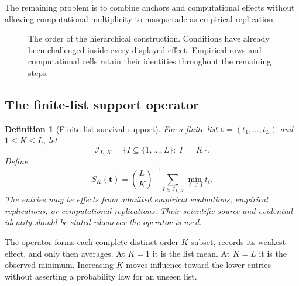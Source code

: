 \documentclass[11pt]{article}
\newtheorem{definition}{Definition}
\theoremstyle{remark}
\begin{document}
The remaining problem is to combine anchors and computational effects without
allowing computational multiplicity to masquerade as empirical replication.

\begin{figure}[htbp]
\centering
{}
\caption{The order of the hierarchical construction. Conditions have already
been challenged inside every displayed effect. Empirical rows and
computational cells retain their identities throughout the remaining steps.}
\label{fig:hierarchy-schematic}
\end{figure}

\subsection{The finite-list support operator}

\begin{definition}[Finite-list survival support]
\label{def:support}
For a finite list $\mathbf t=(t_1,\ldots,t_L)$ and $1\leq K\leq L$, let
\[
\mathcal I_{L,K}
=
\{I\subseteq\{1,\ldots,L\}:|I|=K\}.
\]
Define
\begin{equation}
S_K(\mathbf t)
=
\binom{L}{K}^{-1}
\sum_{I\in\mathcal I_{L,K}}
\min_{\ell\in I}t_\ell.
\label{eq:finite-list-support}
\end{equation}
The entries may be effects from admitted empirical evaluations, empirical
replications, or computational replications. Their scientific source and
evidential identity should be stated whenever the operator is used.
\end{definition}

The operator forms each complete distinct order-$K$ subset, records its weakest
effect, and only then averages. At $K=1$ it is the list mean. At $K=L$ it is
the observed minimum. Increasing $K$ moves influence toward the lower entries
without asserting a probability law for an unseen list.
\end{document}
